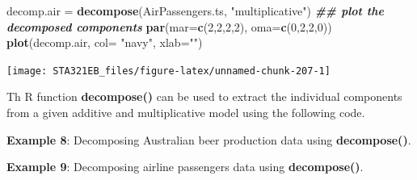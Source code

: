 \documentclass[
]{book}
\newenvironment{Shaded}{\begin{snugshade}}{\end{snugshade}}
\newcommand{\AttributeTok}[1]{\textcolor[rgb]{0.13,0.29,0.53}{#1}}
\newcommand{\CommentTok}[1]{\textcolor[rgb]{0.56,0.35,0.01}{\textit{#1}}}
\newcommand{\DecValTok}[1]{\textcolor[rgb]{0.00,0.00,0.81}{#1}}
\newcommand{\DocumentationTok}[1]{\textcolor[rgb]{0.56,0.35,0.01}{\textbf{\textit{#1}}}}
\newcommand{\FunctionTok}[1]{\textcolor[rgb]{0.13,0.29,0.53}{\textbf{#1}}}
\newcommand{\NormalTok}[1]{#1}
\newcommand{\OtherTok}[1]{\textcolor[rgb]{0.56,0.35,0.01}{#1}}
\newcommand{\SpecialCharTok}[1]{\textcolor[rgb]{0.81,0.36,0.00}{\textbf{#1}}}
\newcommand{\StringTok}[1]{\textcolor[rgb]{0.31,0.60,0.02}{#1}}
\begin{document}
\begin{Shaded}
\begin{Highlighting}[]
\NormalTok{decomp.air }\OtherTok{=} \FunctionTok{decompose}\NormalTok{(AirPassengers.ts, }\StringTok{"multiplicative"}\NormalTok{)}
\DocumentationTok{\#\# plot the decomposed components}
\FunctionTok{par}\NormalTok{(}\AttributeTok{mar=}\FunctionTok{c}\NormalTok{(}\DecValTok{2}\NormalTok{,}\DecValTok{2}\NormalTok{,}\DecValTok{2}\NormalTok{,}\DecValTok{2}\NormalTok{), }\AttributeTok{oma=}\FunctionTok{c}\NormalTok{(}\DecValTok{0}\NormalTok{,}\DecValTok{2}\NormalTok{,}\DecValTok{2}\NormalTok{,}\DecValTok{0}\NormalTok{))}
\FunctionTok{plot}\NormalTok{(decomp.air, }\AttributeTok{col=} \StringTok{"navy"}\NormalTok{, }\AttributeTok{xlab=}\StringTok{""}\NormalTok{)}
\end{Highlighting}
\end{Shaded}

\begin{center}\texttt{[image: STA321EB\_files/figure-latex/unnamed-chunk-207-1]} \end{center}

Th R function \textbf{decompose()} can be used to extract the individual components from a given additive and multiplicative model using the following code.

\textbf{Example 8}: Decomposing Australian beer production data using \textbf{decompose()}.

\begin{Shaded}
\end{Shaded}

\textbf{Example 9}: Decomposing airline passengers data using \textbf{decompose()}.

\begin{Shaded}
\end{Shaded}
\end{document}

